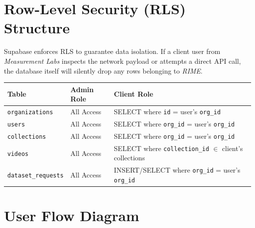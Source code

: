 \documentclass[a4paper,11pt]{article}
\begin{document}
\begin{center}
\end{center}

\newpage
\section{Row-Level Security (RLS) Structure}
Supabase enforces RLS to guarantee data isolation. If a client user from \textit{Measurement Labs} inspects the network payload or attempts a direct API call, the database itself will silently drop any rows belonging to \textit{RIME}.

\begin{table}[h]
\centering
\renewcommand{\arraystretch}{1.5}
\begin{tabular}{@{} l l l @{}}
\toprule
\textbf{Table} & \textbf{Admin Role} & \textbf{Client Role} \\
\midrule
\texttt{organizations} & All Access & SELECT where \texttt{id} = user's \texttt{org\_id} \\
\texttt{users} & All Access & SELECT where \texttt{org\_id} = user's \texttt{org\_id} \\
\texttt{collections} & All Access & SELECT where \texttt{org\_id} = user's \texttt{org\_id} \\
\texttt{videos} & All Access & SELECT where \texttt{collection\_id} $\in$ client's collections \\
\texttt{dataset\_requests} & All Access & INSERT/SELECT where \texttt{org\_id} = user's \texttt{org\_id} \\
\bottomrule
\end{tabular}
\end{table}

\section{User Flow Diagram}
\end{document}
